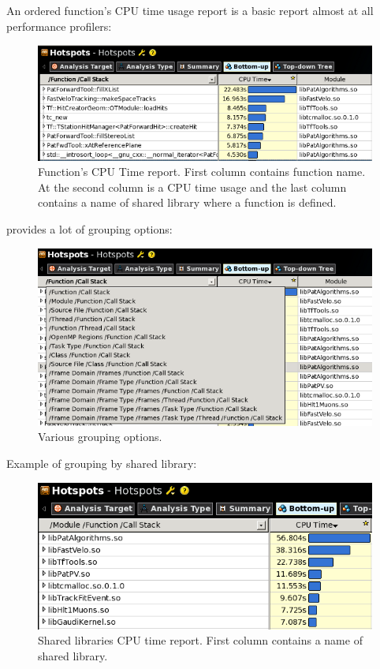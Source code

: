 \documentclass[a4paper]{jpconf}
\begin{document}
An ordered function’s CPU time usage report is a basic report almost at all performance profilers:

\begin{figure}[H]
\begin{minipage}{\textwidth}
\includegraphics[width=\textwidth]{figs/fig01.png}
\caption{\label{fig01}Function’s CPU Time report. First column contains function name. At the second column is a CPU time usage and the last column contains a name of shared library where a function is defined.}
\end{minipage}
\end{figure}

\amp provides a lot of grouping options: 
\begin{figure}[H]
\begin{minipage}{\textwidth}
\includegraphics[width=\textwidth]{figs/fig02.png}
\caption{\label{fig02}Various grouping options.}
\end{minipage}
\end{figure}

Example of grouping by shared library:

\begin{figure}[H]
\begin{minipage}{\textwidth}
\includegraphics[width=\textwidth]{figs/fig03.png}
\caption{\label{fig03}Shared libraries  CPU time report. First column contains a name of shared library.}
\end{minipage}
\end{figure}
\end{document}
